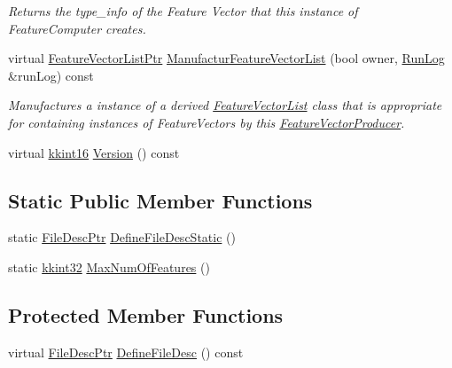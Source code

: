 \begin{DoxyCompactItemize}
\begin{DoxyCompactList}\small\item\em Returns the \textquotesingle{}type\+\_\+info\textquotesingle{} of the Feature Vector that this instance of \textquotesingle{}Feature\+Computer\textquotesingle{} creates. \end{DoxyCompactList}\item 
virtual \hyperlink{namespace_k_k_m_l_l_acf2ba92a3cf03e2b19674b24ff488ef6}{Feature\+Vector\+List\+Ptr} \hyperlink{class_k_k_m_l_l_1_1_gray_scale_images_f_v_producer_a8c118271dc9bac941f86adcd5dd44a6f}{Manufactur\+Feature\+Vector\+List} (bool owner, \hyperlink{class_k_k_b_1_1_run_log}{Run\+Log} \&run\+Log) const 
\begin{DoxyCompactList}\small\item\em Manufactures a instance of a derived \textquotesingle{}\hyperlink{class_k_k_m_l_l_1_1_feature_vector_list}{Feature\+Vector\+List}\textquotesingle{} class that is appropriate for containing instances of Feature\+Vectors by this \hyperlink{class_k_k_m_l_l_1_1_feature_vector_producer}{Feature\+Vector\+Producer}. \end{DoxyCompactList}\item 
virtual \hyperlink{namespace_k_k_b_a93809780ee294124dda4c23069f41248}{kkint16} \hyperlink{class_k_k_m_l_l_1_1_gray_scale_images_f_v_producer_aaa9437b36ae935eec369341935fd21f9}{Version} () const 
\end{DoxyCompactItemize}
\subsection*{Static Public Member Functions}
\begin{DoxyCompactItemize}
\item 
static \hyperlink{namespace_k_k_m_l_l_aa0d0b6ab4ec18868a399b8455b05d914}{File\+Desc\+Ptr} \hyperlink{class_k_k_m_l_l_1_1_gray_scale_images_f_v_producer_a077006af32da9856f20e77fd32898624}{Define\+File\+Desc\+Static} ()
\item 
static \hyperlink{namespace_k_k_b_a8fa4952cc84fda1de4bec1fbdd8d5b1b}{kkint32} \hyperlink{class_k_k_m_l_l_1_1_gray_scale_images_f_v_producer_a7f3991a75f9a7345b6f6c29dac5bc479}{Max\+Num\+Of\+Features} ()
\end{DoxyCompactItemize}
\subsection*{Protected Member Functions}
\begin{DoxyCompactItemize}
\item 
virtual \hyperlink{namespace_k_k_m_l_l_aa0d0b6ab4ec18868a399b8455b05d914}{File\+Desc\+Ptr} \hyperlink{class_k_k_m_l_l_1_1_gray_scale_images_f_v_producer_a16e9b5b35454bb61df2d1330790ec72a}{Define\+File\+Desc} () const 
\end{DoxyCompactItemize}
